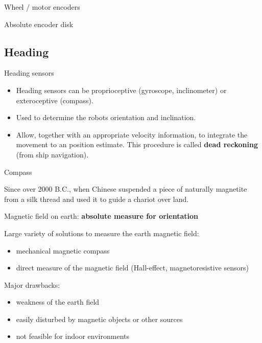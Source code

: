 \documentclass[compress]{beamer}
\begin{document}
\begin{frame}{Wheel / motor encoders}
\begin{multicols}{2}
        Absolute encoder disk

    \end{multicols}

\end{frame}

\subsection{Heading}
\begin{frame}{Heading sensors}

    \begin{itemize}
        \item Heading sensors can be proprioceptive (gyroscope, inclinometer) or
            exteroceptive (compass).

        \item Used to determine the robots orientation and inclination.

        \item Allow, together with an appropriate velocity information, to integrate the
            movement to an position estimate. This procedure is called
            {\bf dead reckoning} (from ship navigation).

    \end{itemize}
\end{frame}

\begin{frame}{Compass}

    Since over 2000 B.C., when Chinese suspended a piece of naturally magnetite from a silk
    thread and used it to guide a chariot over land.

    Magnetic field on earth: {\bf absolute measure for orientation}

    Large variety of solutions to measure the earth magnetic field:
    \begin{itemize}
        \item mechanical magnetic compass
        \item direct measure of the magnetic field (Hall-effect, magnetoresistive
            sensors)
    \end{itemize}

    Major drawbacks:

    \begin{itemize}
        \item weakness of the earth field
        \item easily disturbed by magnetic objects or other sources
        \item not feasible for indoor environments
    \end{itemize}

\end{frame}
\end{document}
